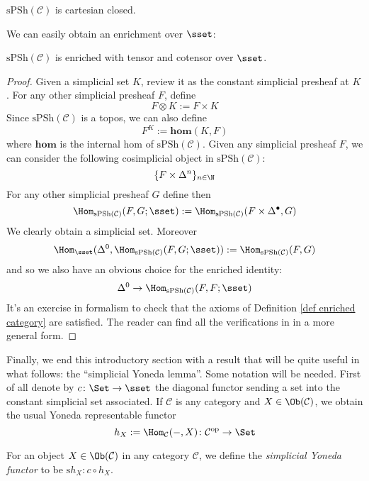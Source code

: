 \begin{cor}
$\mathrm{sPSh}(\mathcal C)$ is cartesian closed.
\end{cor}

We can easily obtain an enrichment over $\sset$:

\begin{prop} \label{prop enriched simplicial presheaves}
$\mathrm{sPSh}(\mathcal C)$ is enriched with tensor and cotensor over $\sset$.
\end{prop}

\begin{proof}
Given a simplicial set $K$, review it as the constant simplicial presheaf at $K$. For any other simplicial presheaf $F$, define
\[
F \otimes K := F \times K
\]
Since $\mathrm{sPSh}(\mathcal C)$ is a topos, we can also define
\[
F^K := \mathbf{hom}(K,F)
\]
where $\mathbf{hom}$ is the internal hom of $\mathrm{sPSh}(\mathcal C)$. Given any simplicial presheaf $F$, we can consider the following cosimplicial object in $\mathrm{sPSh}(\mathcal C)$:
\[
\{F \times \Delta^n\}_{n \in \N}
\]
For any other simplicial presheaf $G$ define then
\[
\Hom_{\mathrm{sPSh}(\mathcal C)} (F,G;\sset) := \Hom_{\mathrm{sPSh}(\mathcal C)}(F \times \Delta^\bullet,G)
\]
We clearly obtain a simplicial set. Moreover
\[
\Hom_{\sset}(\Delta^0, \Hom_{\mathrm{sPSh}(\mathcal C)} (F,G;\sset)) := \Hom_{\mathrm{sPSh}(\mathcal C)}(F,G)
\]
and so we also have an obvious choice for the enriched identity:
\[
\Delta^0 \to \Hom_{\mathrm{sPSh}(\mathcal C)}(F,F;\sset)
\]
It's an exercise in formalism to check that the axioms of Definition \ref{def enriched category} are satisfied. The reader can find all the verifications in  in a more general form.
\end{proof}

Finally, we end this introductory section with a result that will be quite useful in what follows: the ``simplicial Yoneda lemma''. Some notation will be needed. First of all denote by $c \colon \Set \to \sset$ the diagonal functor sending a set into the constant simplicial set associated. If $\mathcal C$ is any category and $X \in \Ob(\mathcal C)$, we obtain the usual Yoneda representable functor
\[
h_X := \Hom_{\mathcal C}(-,X) \colon \mathcal C^{\mathrm{op}} \to \Set
\]

\begin{defin}
For an object $X \in \Ob(\mathcal C)$ in any category $\mathcal C$, we define the \emph{simplicial Yoneda functor} to be $\mathrm sh_X \colon c \circ h_X$.
\end{defin}

